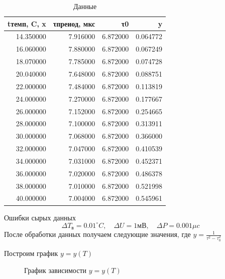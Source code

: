 \documentclass{article}
\begin{document}
\begin{table}[!h]
\begin{center}
    \begin{tabular}{rrrr}
        \toprule
        tтемп, C, x & τпреиод, мкс & τ0 & y \\
        \midrule
        14.350000 & 7.916000 & 6.872000 & 0.064772 \\
        16.060000 & 7.880000 & 6.872000 & 0.067249 \\
        18.070000 & 7.785000 & 6.872000 & 0.074728 \\
        20.040000 & 7.648000 & 6.872000 & 0.088751 \\
        22.000000 & 7.484000 & 6.872000 & 0.113819 \\
        24.000000 & 7.270000 & 6.872000 & 0.177667 \\
        26.000000 & 7.152000 & 6.872000 & 0.254665 \\
        28.000000 & 7.100000 & 6.872000 & 0.313911 \\
        30.000000 & 7.068000 & 6.872000 & 0.366000 \\
        32.000000 & 7.047000 & 6.872000 & 0.410539 \\
        34.000000 & 7.031000 & 6.872000 & 0.452371 \\
        36.000000 & 7.020000 & 6.872000 & 0.486378 \\
        38.000000 & 7.010000 & 6.872000 & 0.521998 \\
        40.000000 & 7.004000 & 6.872000 & 0.545961 \\
        \bottomrule
        \end{tabular}\end{center}
\caption{Данные}
\label{raw_data}
\end{table}

Ошибки сырых данных
\begin{equation*}
    \Delta T_{в} = 0.01 ^\circ C \mathrm{,}\quad
    \Delta U = 1мВ \mathrm{,}\quad\Delta
    P = 0.001 \mu c
\end{equation*}
После обработки данных получаем следующие значения, где $y=\frac{1}{\tau^2-\tau^2_0}$

\newpage
Построим график $y=y(T)$

\begin{figure}[h]
    \caption{График зависимости $y=y(T)$}
    \label{plot}
\end{figure}
\end{document}
